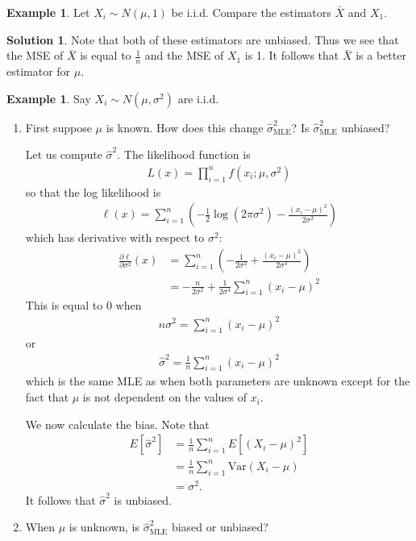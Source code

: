 \documentclass[11pt]{amsart}
\theoremstyle{definition}
\newtheorem{example}[theorem]{Example}
\newtheorem{solution}[theorem]{Solution}
\numberwithin{equation}{section}
\begin{document}
\begin{example}
    Let $X_i\sim N(\mu,1)$ be i.i.d. Compare the estimators $\bar X$ and $X_1$.
\end{example}
\begin{solution}
    Note that both of these estimators are unbiased. Thus we see that the MSE of $\bar X$ is equal to $\frac{1}{n}$ and the MSE of $X_1$ is 1. It follows that $\bar X$ is a better estimator for $\mu$.
\end{solution}
\begin{example}
    Say $X_i\sim N(\mu,\sigma^2)$ are i.i.d. 
    \begin{enumerate}
        \item First suppose $\mu$ is known. How does this change $\hat\sigma_{\mathrm{MLE}}^2$? Is $\hat\sigma^2_{\mathrm{MLE}}$ unbiased?

        Let us compute $\hat\sigma^2$. The likelihood function is
        \begin{align*}
            L(x)=\prod_{i=1}^nf(x_i;\mu,\sigma^2)
        \end{align*}
        so that the log likelihood is
        \begin{align*}
            \ell(x)=\sum_{i=1}^n\left(-\frac{1}{2}\log(2\pi\sigma^2)-\frac{(x_i-\mu)^2}{2\sigma^2}\right)
        \end{align*}
        which has derivative with respect to $\sigma^2$:
        \begin{align*}
            \frac{\partial\ell}{\partial \sigma^2}(x)&=\sum_{i=1}^n\left(-\frac{1}{2\sigma^2}+\frac{(x_i-\mu)^2}{2\sigma^4}\right)\\
            &=-\frac{n}{2\sigma^2}+\frac{1}{2\sigma^4}\sum_{i=1}^n(x_i-\mu)^2
        \end{align*}
        This is equal to 0 when
        \begin{align*}
            n\sigma^2=\sum_{i=1}^n(x_i-\mu)^2
        \end{align*}
        or 
        \begin{align*}
            \hat\sigma^2=\frac{1}{n}\sum_{i=1}^n(x_i-\mu)^2
        \end{align*}
        which is the same MLE as when both parameters are unknown except for the fact that $\mu$ is not dependent on the values of $x_i$.

        We now calculate the bias. Note that 
        \begin{align*}
            E[\hat\sigma^2]&=\frac{1}{n}\sum_{i=1}^nE[(X_i-\mu)^2]\\
            &=\frac{1}{n}\sum_{i=1}^n\mathrm{Var}(X_i-\mu)\\
            &=\sigma^2.
        \end{align*}
        It follows that $\hat\sigma^2$ is unbiased.
        \item When $\mu$ is unknown, is $\hat\sigma^2_{\mathrm{MLE}}$ biased or unbiased?


\end{enumerate}
\end{example}
\end{document}
